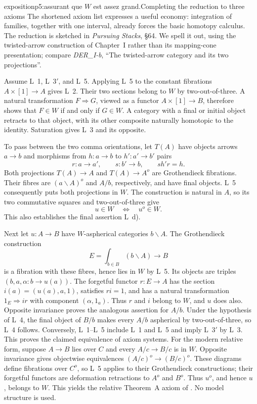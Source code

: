 \begin{dcomment}{exposition}{p5:assurant que $W$ est assez grand.}{Completing the reduction to three axioms}
The shortened axiom list expresses a useful economy: integration of families, together with one interval, already forces the basic homotopy calculus. The reduction is sketched in \emph{Pursuing Stacks}, \S64. We spell it out, using the twisted-arrow construction of Chapter~I rather than its mapping-cone presentation; compare \emph{DER\_I-b}, ``The twisted-arrow category and its two projections''.

Assume L~1, L~3$'$, and L~5. Applying L~5 to the constant fibrations $A\times[1]\to A$ gives L~2. Their two sections belong to $W$ by two-out-of-three. A natural transformation $F\Rightarrow G$, viewed as a functor $A\times[1]\to B$, therefore shows that $F\in W$ if and only if $G\in W$. A category with a final or initial object retracts to that object, with its other composite naturally homotopic to the identity. Saturation gives L~3 and its opposite.

To pass between the two comma orientations, let $T(A)$ have objects arrows $a\to b$ and morphisms from $h:a\to b$ to $h':a'\to b'$ pairs
\[
 r:a\to a',\qquad s:b'\to b,\qquad s h'r=h.
\]
Both projections $T(A)\to A$ and $T(A)\to A^o$ are Grothendieck fibrations. Their fibres are $(a\backslash A)^o$ and $A/b$, respectively, and have final objects. L~5 consequently puts both projections in $W$. The construction is natural in $A$, so its two commutative squares and two-out-of-three give
\[
 u\in W\quad\Longleftrightarrow\quad u^o\in W.
\]
This also establishes the final assertion L~d).

Next let $u:A\to B$ have $W$-aspherical categories $b\backslash A$. The Grothendieck construction
\[
 E=\int_{b\in B}(b\backslash A)\longrightarrow B
\]
is a fibration with these fibres, hence lies in $W$ by L~5. Its objects are triples $(b,a,\alpha:b\to u(a))$. The forgetful functor $r:E\to A$ has the section $i(a)=(u(a),a,1)$, satisfies $ri=1$, and has a natural transformation $1_E\Rightarrow ir$ with component $(\alpha,1_a)$. Thus $r$ and $i$ belong to $W$, and $u$ does also. Opposite invariance proves the analogous assertion for $A/b$. Under the hypothesis of L~4, the final object of $B/b$ makes every $A/b$ aspherical by two-out-of-three, so L~4 follows. Conversely, L~1--L~5 include L~1 and L~5 and imply L~3$'$ by L~3. This proves the claimed equivalence of axiom systems. For the modern relative form, suppose $A\to B$ lies over $C$ and every $A/c\to B/c$ is in $W$. Opposite invariance gives objectwise equivalences $(A/c)^o\to(B/c)^o$. These diagrams define fibrations over $C^o$, so L~5 applies to their Grothendieck constructions; their forgetful functors are deformation retractions to $A^o$ and $B^o$. Thus $u^o$, and hence $u$, belongs to $W$. This yields the relative Theorem~A axiom of \citet[Definition~1.1.3]{Cisinski2004Minimal}. No model structure is used.
\end{dcomment}

